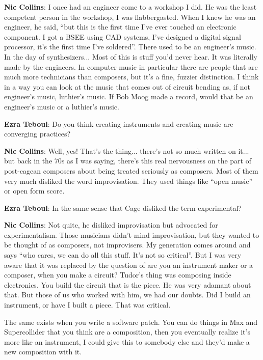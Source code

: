 \textbf{Nic Collins}: I once had an engineer come to a workshop I did. He was the least competent person in the workshop, I was flabbergasted. When I knew he was an engineer, he said, ``but this is the first time I’ve ever touched an electronic component. I got a BSEE using CAD systems, I’ve designed a digital signal processor, it’s the first time I’ve soldered''. There used to be an engineer’s music. In the day of synthesizers... Most of this is stuff you’d never hear. It was literally made by the engineers. In computer music in particular there are people that are much more technicians than composers, but it’s a fine, fuzzier distinction. I think in a way you can look at the music that comes out of circuit bending as, if not engineer’s music, luthier’s music. If Bob Moog made a record, would that be an engineer’s music or a luthier’s music.
					
\textbf{Ezra Teboul}: Do you think creating instruments and creating music are converging practices?
					
\textbf{Nic Collins}: Well, yes! That’s the thing... there’s not so much written on it... but back in the 70s as I was saying, there’s this real nervousness on the part of post-cagean composers about being treated seriously as composers. Most of them very much disliked the word improvisation. They used things like ``open music'' or open form score.
					
\textbf{Ezra Teboul}: In the same sense that Cage disliked the term experimental?
					
\textbf{Nic Collins}: Not quite, he disliked improvisation but advocated for experimentalism. Those musicians didn’t mind improvisation, but they wanted to be thought of as composers, not improvisers. My generation comes around and says ``who cares, we can do all this stuff. It’s not so critical''. But I was very aware that it was replaced by the question of are you an instrument maker or a composer, when you make a circuit? Tudor’s thing was composing inside electronics. You build the circuit that is the piece. He was very adamant about that. But those of us who worked with him, we had our doubts. Did I build an instrument, or have I built a piece. That was critical.		
						
The same exists when you write a software patch. You can do things in Max and Supercollider that you think are a composition, then you eventually realize it’s more like an instrument, I could give this to somebody else and they’d make a new composition with it.
					
